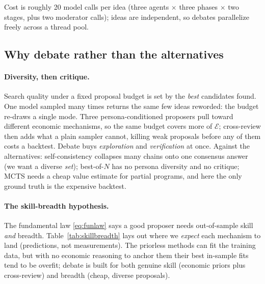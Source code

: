 \documentclass{article}
\theoremstyle{definition}
\theoremstyle{plain}
\theoremstyle{remark}
\newcommand{\Expr}{\mathcal{E}}
\begin{document}
Cost is roughly 20 model calls per idea (three agents $\times$ three phases
$\times$ two stages, plus two moderator calls); ideas are independent, so debates
parallelize freely across a thread pool.

\subsection{Why debate rather than the alternatives}
\label{sec:whydebate}

\paragraph{Diversity, then critique.} Search quality under a fixed proposal budget is
set by the \emph{best} candidates found. One model sampled many times returns the same
few ideas reworded: the budget re-draws a single mode. Three persona-conditioned
proposers pull toward different economic mechanisms, so the same budget covers more of
$\Expr$; cross-review then adds what a plain sampler cannot, killing weak proposals
before any of them costs a backtest. Debate buys \emph{exploration} and
\emph{verification} at once. Against the alternatives: self-consistency collapses many
chains onto one consensus answer (we want a diverse \emph{set}); best-of-$N$ has no
persona diversity and no critique; MCTS needs a cheap value estimate for partial
programs, and here the only ground truth is the expensive backtest.

\paragraph{The skill-breadth hypothesis.} The fundamental law \eqref{eq:funlaw} says a
good proposer needs out-of-sample skill \emph{and} breadth.
Table~\ref{tab:skillbreadth} lays out where we \emph{expect} each mechanism to land
(predictions, not measurements). The priorless methods can fit the training data, but
with no economic reasoning to anchor them their best in-sample fits tend to be overfit;
debate is built for both genuine skill (economic priors plus cross-review) and breadth
(cheap, diverse proposals).
\end{document}
